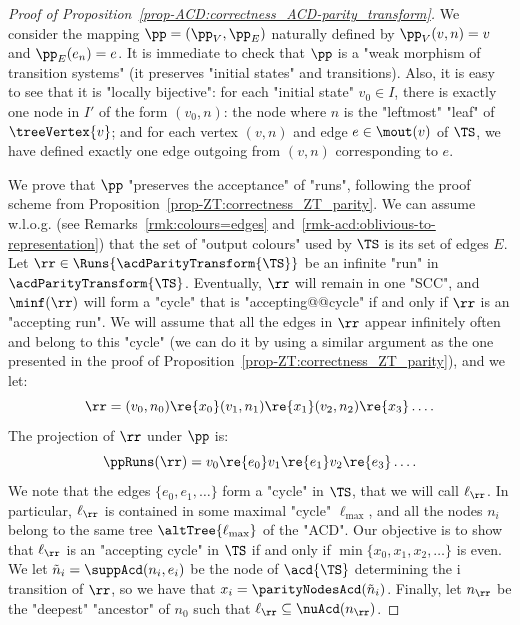 \documentclass{theoretics}
\begin{document}
\begin{proof}[Proof of Proposition~\ref{prop-ACD:correctness_ACD-parity_transform}]
	We consider the mapping $\pp = (\pp_V, \pp_E)$ naturally defined by $\pp_V(v,n) = v$ and $\pp_E(e_n) = e$. 
	It is immediate to check that $\pp$ is a "weak morphism of transition systems" (it preserves "initial states" and transitions). Also, it is easy to see that it is "locally bijective": for each "initial state" $v_0\in I$, there is exactly one node in $I'$ of the form $(v_0, n)$: the node where $n$ is the "leftmost" "leaf" of $\treeVertex{v}$; and for each vertex $(v,n)$ and edge $e\in \mout(v)$ of $\TS$, we have defined exactly one edge outgoing from $(v,n)$ corresponding to $e$.
	
	We prove that $\pp$ "preserves the acceptance" of "runs", following the proof scheme from Proposition~\ref{prop-ZT:correctness_ZT_parity}. We can assume w.l.o.g. (see Remarks~\ref{rmk:colours=edges} and~\ref{rmk-acd:oblivious-to-representation}) that the set of "output colours" used by $\TS$ is its set of edges $E$.
	Let $\rr\in \Runs{\acdParityTransform{\TS}}$ be an infinite "run" in $\acdParityTransform{\TS}$. Eventually, $\rr$ will remain in one "SCC", and $\minf(\rr)$ will form a "cycle"  that is "accepting@@cycle" if and only if $\rr$ is an "accepting run".
	We will assume that all the edges in $\rr$ appear infinitely often and belong to this "cycle" (we can do it by using a similar argument as the one presented in the proof of Proposition~\ref{prop-ZT:correctness_ZT_parity}), and we let:
	\[ \rr = (v_0, n_0) \re{x_0} (v_1, n_1) \re{x_1} (v_2, n_2) \re{x_3}\dots .  \]
	The projection of $\rr$ under $\pp$ is:
	\[ \ppRuns(\rr) = v_0\re{e_0} v_1 \re{e_1} v_2 \re{e_3}\dots. \]
	We note that the edges $\{e_0, e_1, \dots \}$ form a "cycle" in $\TS$, that we will call $\ell_\rr$. In particular, $\ell_\rr$ is contained in some maximal "cycle" $\ell_{\max}$, and all the nodes $n_i$ belong to the same tree $\altTree{\ell_{\max}}$ of the "ACD".
	Our objective is to show that $\ell_\rr$ is an "accepting cycle"  in $\TS$ if and only if $\min \{x_0, x_1, x_2,\dots\}$ is even.
	We let $\tilde{n}_i = \suppAcd(n_i, e_i)$ be the node of $\acd{\TS}$ determining the i transition of $\rr$, so we have that $x_i = \parityNodesAcd(\tilde{n}_i)$. 
	Finally, let $n_\rr$ be the "deepest" "ancestor" of $n_0$ such that $\ell_\rr \subseteq \nuAcd(n_\rr)$.
	

\end{proof}
\end{document}
